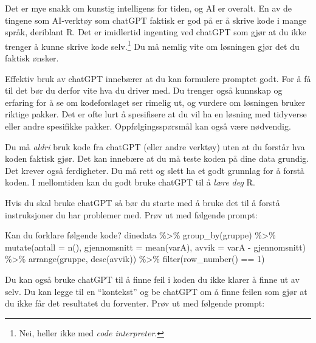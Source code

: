 \documentclass[
  letterpaper,
  DIV=11,
  numbers=noendperiod]{scrreprt}
\newenvironment{Shaded}{\begin{snugshade}}{\end{snugshade}}
\newcommand{\AttributeTok}[1]{\textcolor[rgb]{0.40,0.45,0.13}{#1}}
\newcommand{\DecValTok}[1]{\textcolor[rgb]{0.68,0.00,0.00}{#1}}
\newcommand{\FunctionTok}[1]{\textcolor[rgb]{0.28,0.35,0.67}{#1}}
\newcommand{\NormalTok}[1]{\textcolor[rgb]{0.00,0.23,0.31}{#1}}
\newcommand{\SpecialCharTok}[1]{\textcolor[rgb]{0.37,0.37,0.37}{#1}}
\theoremstyle{definition}
\theoremstyle{remark}
\begin{document}
Det er mye snakk om kunstig intelligens for tiden, og AI er overalt. En
av de tingene som AI-verktøy som chatGPT faktisk er god på er å skrive
kode i mange språk, deriblant R. Det er imidlertid ingenting ved chatGPT
som gjør at du ikke trenger å kunne skrive kode selv.\footnote{Nei,
  heller ikke med \emph{code interpreter}.} Du må nemlig vite om
løsningen gjør det du faktisk ønsker.

Effektiv bruk av chatGPT innebærer at du kan formulere promptet godt.
For å få til det bør du derfor vite hva du driver med. Du trenger også
kunnskap og erfaring for å se om kodeforslaget ser rimelig ut, og
vurdere om løsningen bruker riktige pakker. Det er ofte lurt å
spesifisere at du vil ha en løsning med tidyverse eller andre spesifikke
pakker. Oppfølgingsspørsmål kan også være nødvendig.

Du må \emph{aldri} bruk kode fra chatGPT (eller andre verktøy) uten at
du forstår hva koden faktisk gjør. Det kan innebære at du må teste koden
på dine data grundig. Det krever også ferdigheter. Du må rett og slett
ha et godt grunnlag for å forstå koden. I mellomtiden kan du godt bruke
chatGPT til å \emph{lære deg} R.

Hvis du skal bruke chatGPT så bør du starte med å bruke det til å forstå
instruksjoner du har problemer med. Prøv ut med følgende prompt:

\begin{Shaded}
\begin{Highlighting}[]
\NormalTok{Kan du forklare følgende kode? }
\NormalTok{  dinedata }\SpecialCharTok{\%\textgreater{}\%} 
  \FunctionTok{group\_by}\NormalTok{(gruppe) }\SpecialCharTok{\%\textgreater{}\%} 
  \FunctionTok{mutate}\NormalTok{(}\AttributeTok{antall =} \FunctionTok{n}\NormalTok{(), }\AttributeTok{gjennomsnitt =} \FunctionTok{mean}\NormalTok{(varA), }
         \AttributeTok{avvik =}\NormalTok{ varA }\SpecialCharTok{{-}}\NormalTok{ gjennomsnitt) }\SpecialCharTok{\%\textgreater{}\%} 
  \FunctionTok{arrange}\NormalTok{(gruppe, }\FunctionTok{desc}\NormalTok{(avvik)) }\SpecialCharTok{\%\textgreater{}\%} 
  \FunctionTok{filter}\NormalTok{(}\FunctionTok{row\_number}\NormalTok{() }\SpecialCharTok{==} \DecValTok{1}\NormalTok{)}
\end{Highlighting}
\end{Shaded}

Du kan også bruke chatGPT til å finne feil i koden du ikke klarer å
finne ut av selv. Du kan legge til en ``kontekst'' og be chatGPT om å
finne feilen som gjør at du ikke får det resultatet du forventer. Prøv
ut med følgende prompt:
\end{document}
